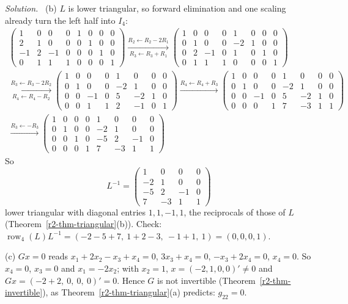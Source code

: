 \documentclass[12pt]{article}
\DeclareMathOperator{\row}{row}
\theoremstyle{definition}
\newenvironment{solution}{\par\noindent\textit{Solution.}\ }{\par\smallskip}
\begin{document}
\begin{solution}
(b) \(L\) is lower triangular, so forward elimination and one scaling already turn the left half into \(I_4\):
\[
\begin{gathered}
\left(\begin{array}{cccc|cccc}1&0&0&0&1&0&0&0\\2&1&0&0&0&1&0&0\\-1&2&-1&0&0&0&1&0\\0&1&1&1&0&0&0&1\end{array}\right)
\xrightarrow[R_3\leftarrow R_3+R_1]{R_2\leftarrow R_2-2R_1}
\left(\begin{array}{cccc|cccc}1&0&0&0&1&0&0&0\\0&1&0&0&-2&1&0&0\\0&2&-1&0&1&0&1&0\\0&1&1&1&0&0&0&1\end{array}\right)
\\
\xrightarrow[R_4\leftarrow R_4-R_2]{R_3\leftarrow R_3-2R_2}
\left(\begin{array}{cccc|cccc}1&0&0&0&1&0&0&0\\0&1&0&0&-2&1&0&0\\0&0&-1&0&5&-2&1&0\\0&0&1&1&2&-1&0&1\end{array}\right)
\xrightarrow{R_4\leftarrow R_4+R_3}
\left(\begin{array}{cccc|cccc}1&0&0&0&1&0&0&0\\0&1&0&0&-2&1&0&0\\0&0&-1&0&5&-2&1&0\\0&0&0&1&7&-3&1&1\end{array}\right)
\\
\xrightarrow{R_3\leftarrow-R_3}
\left(\begin{array}{cccc|cccc}1&0&0&0&1&0&0&0\\0&1&0&0&-2&1&0&0\\0&0&1&0&-5&2&-1&0\\0&0&0&1&7&-3&1&1\end{array}\right)
\end{gathered}
\]
So
\[
L^{-1}=\begin{pmatrix}1&0&0&0\\-2&1&0&0\\-5&2&-1&0\\7&-3&1&1\end{pmatrix}
\]
lower triangular with diagonal entries \(1,1,-1,1\), the reciprocals of those of \(L\)
(Theorem~\ref{r2-thm-triangular}(b)). Check: \(\row_4(L)L^{-1}=(-2-5+7,\ 1+2-3,\ -1+1,\ 1)=(0,0,0,1)\).

(c) \(Gx=0\) reads \(x_1+2x_2-x_3+x_4=0\), \(3x_3+x_4=0\), \(-x_3+2x_4=0\), \(x_4=0\). So \(x_4=0\), \(x_3=0\) and
\(x_1=-2x_2\); with \(x_2=1\), \(x=(-2,1,0,0)'\ne0\) and \(Gx=(-2+2,\ 0,\ 0,\ 0)'=0\). Hence \(G\) is not invertible
(Theorem~\ref{r2-thm-invertible}), as Theorem~\ref{r2-thm-triangular}(a) predicts: \(g_{22}=0\).
\end{solution}
\end{document}
